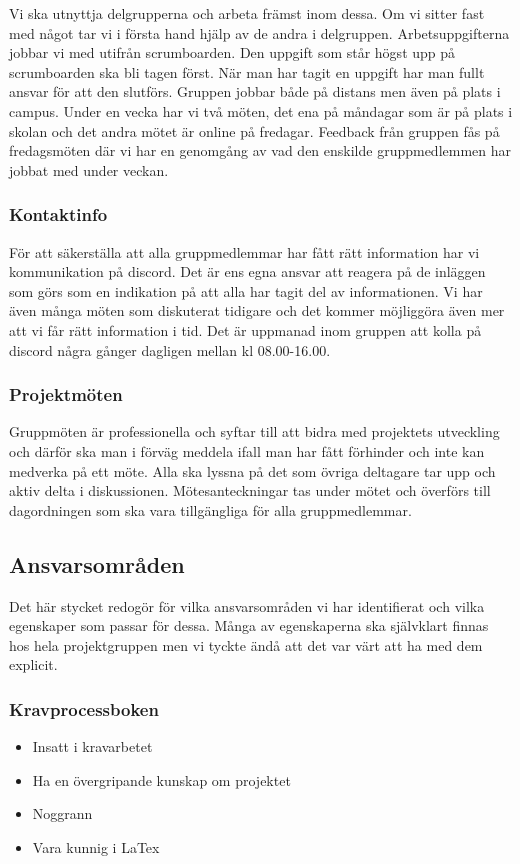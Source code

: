 \documentclass[12pt]{article}
\begin{document}
Vi ska utnyttja delgrupperna och arbeta främst inom dessa. Om vi sitter fast med något tar
vi i första hand hjälp av de andra i delgruppen. Arbetsuppgifterna jobbar vi med utifrån
scrumboarden. Den uppgift som står högst upp på scrumboarden ska bli tagen först. När man har tagit en uppgift har man fullt ansvar för
att den slutförs. Gruppen jobbar både på distans men även på plats i campus. Under en
vecka har vi två möten, det ena på måndagar som är på plats i skolan och det andra mötet är
online på fredagar. Feedback från gruppen fås på fredagsmöten där vi har en genomgång av
vad den enskilde gruppmedlemmen har jobbat med under veckan.

\subsubsection{Kontaktinfo}

För att säkerställa att alla gruppmedlemmar har fått rätt information har vi kommunikation på
discord. Det är ens egna ansvar att reagera på de inläggen som görs som en indikation på att
alla har tagit del av informationen. Vi har även många möten som diskuterat tidigare och det
kommer möjliggöra även mer att vi får rätt information i tid. Det är uppmanad inom gruppen
att kolla på discord några gånger dagligen mellan kl 08.00-16.00.

\subsubsection{Projektmöten}

Gruppmöten är professionella och syftar till att bidra med projektets utveckling och därför
ska man i förväg meddela ifall man har fått förhinder och inte kan medverka på ett möte. Alla
ska lyssna på det som övriga deltagare tar upp och aktiv delta i diskussionen.
Mötesanteckningar tas under mötet och överförs till dagordningen som ska vara tillgängliga
för alla gruppmedlemmar.

\subsection{Ansvarsområden}
Det här stycket redogör för vilka ansvarsområden vi har identifierat och vilka egenskaper som passar för dessa. Många av egenskaperna ska självklart finnas hos hela projektgruppen men vi tyckte ändå att det var värt att ha med dem explicit.

\subsubsection{Kravprocessboken}
\begin{itemize}
\item Insatt i kravarbetet
\item Ha en övergripande kunskap om projektet
\item Noggrann
\item Vara kunnig i LaTex
\end{itemize}
\end{document}
